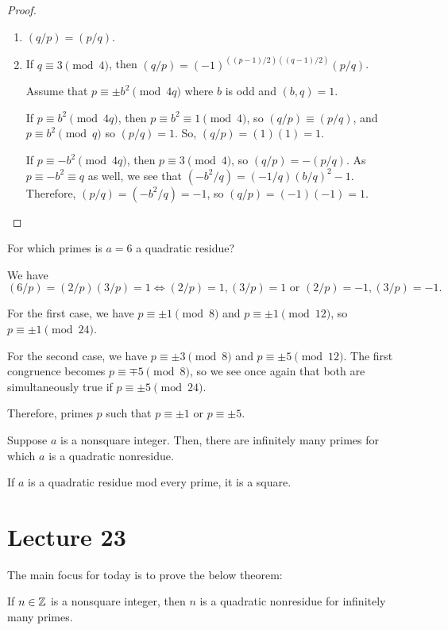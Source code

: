 \documentclass{article}
\begin{document}
\begin{proof} 
	\begin{enumerate} 
		\item $(q / p) = (p / q)$.
		\item
			If $q \equiv 3 \pmod 4$, then $(q / p) = (-1)^{((p-1)/2)((q-1)/2)} (p/q)$.

			Assume that $p \equiv \pm b^2 \pmod{4q}$ where $b$ is odd and $(b, q) = 1$.

			If $p \equiv b^2 \pmod{4q}$, then $p \equiv b^2 \equiv 1 \pmod 4$, so $(q / p) \equiv (p / q)$, and $p \equiv b^2 \pmod q$ so $(p / q) = 1$. So, $(q / p) = (1)(1) = 1$.

			If $p \equiv -b^2 \pmod{4q}$, then $p \equiv 3 \pmod 4$, so $(q / p) = -(p / q)$. As $p \equiv -b^2 \equiv q$ as well, we see that $(-b^2 / q) = (-1 / q)(b / q)^2  -1$. Therefore, $(p / q) = (-b^2 / q) = -1$, so $(q / p) = (-1)(-1) = 1$.
	\end{enumerate}
\end{proof}

\begin{example} 
	For which primes is $a = 6$ a quadratic residue?
\end{example}

We have \[(6 / p) = (2 / p) (3 / p) = 1 \iff (2 / p) = 1, (3 / p) = 1 \text{ or } (2 / p) = -1, (3 / p) = -1.\]

For the first case, we have $p \equiv \pm 1 \pmod 8$ and $p \equiv \pm 1 \pmod{12}$, so $p \equiv \pm 1 \pmod{24}$.

For the second case, we have $p \equiv \pm 3 \pmod 8$ and $p \equiv \pm 5 \pmod{12}$. The first congruence becomes $p \equiv \mp 5 \pmod 8$, so we see once again that both are simultaneously true if $p \equiv \pm 5 \pmod 24$.

Therefore, primes $p$ such that $p \equiv \pm 1$ or $p \equiv \pm 5$.

\begin{theorem}
	Suppose $a$ is a nonsquare integer. Then, there are infinitely many primes for which $a$ is a quadratic nonresidue.
\end{theorem}

\begin{corollary} 
	If $a$ is a quadratic residue mod every prime, it is a square. 
\end{corollary}

\section{Lecture 23}
The main focus for today is to prove the below theorem:
\begin{theorem}
	If $n \in \mathbb Z$ is a nonsquare integer, then $n$ is a quadratic nonresidue for infinitely many primes.
\end{theorem}
\end{document}
